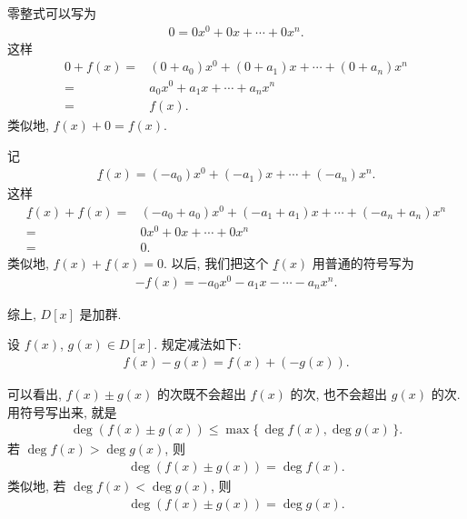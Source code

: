 \begin{pf}
    零整式可以写为
    \begin{align*}
        0 = 0x^0 + 0x + \cdots + 0x^n.
    \end{align*}
    这样
    \begin{align*}
        0 + f(x)
        = {} & (0 + a_0) x^0 + (0 + a_1) x + \cdots + (0 + a_n) x^n \\
        = {} & a_0 x^0 + a_1 x + \cdots + a_n x^n                   \\
        = {} & f(x).
    \end{align*}
    类似地, $f(x) + 0 = f(x)$.

    记
    \begin{align*}
        \underline{f}(x) = (-a_0) x^0 + (-a_1) x + \cdots + (-a_n) x^n.
    \end{align*}
    这样
    \begin{align*}
        \underline{f}(x) + f(x)
        = {} & (-a_0 + a_0) x^0 + (-a_1 + a_1) x + \cdots + (-a_n + a_n) x^n \\
        = {} & 0 x^0 + 0 x + \cdots + 0 x^n                                  \\
        = {} & 0.
    \end{align*}
    类似地, $f(x) + \underline{f}(x) = 0$. 以后, 我们把这个 $\underline{f}(x)$ 用普通的符号写为
    \begin{align*}
        -f(x) = -a_0 x^0 - a_1 x - \cdots - a_n x^n.
    \end{align*}

    综上, $D[x]$ 是加群.
\end{pf}

\begin{definition}
    设 $f(x)$, $g(x) \in D[x]$. 规定减法如下:
    \begin{align*}
        f(x) - g(x) = f(x) + (-g(x)).
    \end{align*}
\end{definition}

\begin{remark}
    可以看出, $f(x) \pm g(x)$ 的次既不会超出 $f(x)$ 的次, 也不会超出 $g(x)$ 的次. 用符号写出来, 就是
    \begin{align*}
        \deg {(f(x) \pm g(x))} \leq \max \{\, \deg f(x), \deg g(x) \,\}.
    \end{align*}
    若 $\deg f(x) > \deg g(x)$, 则
    \begin{align*}
        \deg {(f(x) \pm g(x))} = \deg f(x).
    \end{align*}
    类似地, 若 $\deg f(x) < \deg g(x)$, 则
    \begin{align*}
        \deg {(f(x) \pm g(x))} = \deg g(x).
    \end{align*}
\end{remark}

